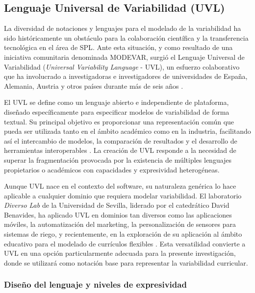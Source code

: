 \subsection{Lenguaje Universal de Variabilidad (UVL)}

La diversidad de notaciones y lenguajes para el modelado de la variabilidad ha sido 
históricamente un obstáculo para la colaboración científica y la transferencia tecnológica 
en el área de \ac{SPL}. Ante esta situación, y como resultado de una 
iniciativa comunitaria denominada MODEVAR, surgió el Lenguaje Universal de Variabilidad 
(\textit{Universal Variability Language} - \ac{UVL}), un esfuerzo colaborativo que ha 
involucrado a investigadoras e investigadores de universidades de España, Alemania, Austria 
y otros países durante más de seis años \citep{benavides2025uvl, sundermann2021yet}.

El \ac{UVL} se define como un lenguaje abierto e independiente de plataforma, diseñado 
específicamente para especificar modelos de variabilidad de forma textual. Su principal 
objetivo es proporcionar una representación común que pueda ser utilizada tanto en el 
ámbito académico como en la industria, facilitando así el intercambio de modelos, la 
comparación de resultados y el desarrollo de herramientas interoperables 
\citep{universalvariabilitylanguage}. La creación de \ac{UVL} responde a la 
necesidad de superar la fragmentación provocada por la existencia de múltiples 
lenguajes propietarios o académicos con capacidades y expresividad heterogéneas.

Aunque \ac{UVL} nace en el contexto del software, su naturaleza genérica lo 
hace aplicable a cualquier dominio que requiera modelar variabilidad. 
El laboratorio \textit{Diverso Lab} de la Universidad de Sevilla, 
liderado por el catedrático David Benavides, ha aplicado \ac{UVL} en 
dominios tan diversos como las aplicaciones móviles, la automatización 
del marketing, la personalización de sensores para sistemas de riego, y 
recientemente, en la exploración de su aplicación al ámbito educativo para 
el modelado de currículos flexibles \citep{investigacionus2025}. 
Esta versatilidad convierte a \ac{UVL} en una opción particularmente 
adecuada para la presente investigación, donde se utilizará como notación 
base para representar la variabilidad curricular.

\subsubsection{Diseño del lenguaje y niveles de expresividad}


